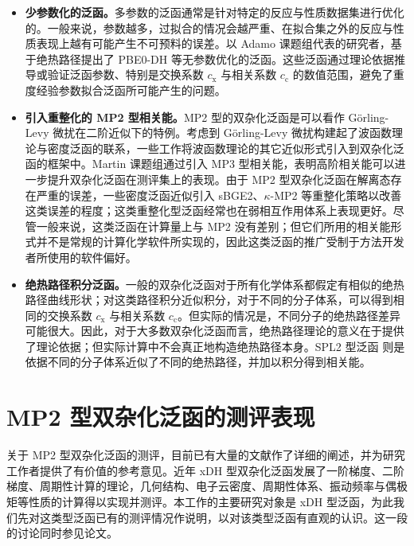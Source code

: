 \begin{itemize}[nosep]
  \item \textbf{少参数化的泛函。}多参数的泛函通常是针对特定的反应与性质数据集进行优化的。一般来说，参数越多，过拟合的情况会越严重、在拟合集之外的反应与性质表现上越有可能产生不可预料的误差\cite{Medvedev-Lyssenko.S.2017}。以 Adamo 课题组代表的研究者，基于绝热路径提出了 PBE0-DH 等无参数优化的泛函\cite{Toulouse-Adamo.JCP.2011}。这些泛函通过理论依据推导或验证泛函参数、特别是交换系数 $c_\mathrm{x}$ 与相关系数 $c_\mathrm{c}$ 的数值范围，避免了重度经验参数拟合泛函所可能产生的问题。
  
  \item \textbf{引入重整化的 MP2 型相关能。}MP2 型的双杂化泛函是可以看作 G\"{o}rling-Levy 微扰在二阶近似下的特例。考虑到 G\"{o}rling-Levy 微扰构建起了波函数理论与密度泛函的联系，一些工作将波函数理论的其它近似形式引入到双杂化泛函的框架中。Martin 课题组通过引入 MP3 型相关能，表明高阶相关能可以进一步提升双杂化泛函在测评集上的表现\cite{Santra-Martin.JPCL.2021}。由于 MP2 型双杂化泛函在解离态存在严重的误差，一些密度泛函\cite{Zhang-Scheffler.PRL.2016, Santra-Martin.JPCL.2022}近似引入 sBGE2\cite{Zhang-Scheffler.NJP.2016}、$\kappa$-MP2\cite{Lee-Head-Gordon.JCTC.2018} 等重整化策略以改善这类误差的程度；这类重整化型泛函经常也在弱相互作用体系上表现更好。尽管一般来说，这类泛函在计算量上与 MP2 没有差别；但它们所用的相关能形式并不是常规的计算化学软件所实现的，因此这类泛函的推广受制于方法开发者所使用的软件偏好。
  
  \item \textbf{绝热路径积分泛函。}一般的双杂化泛函对于所有化学体系都假定有相似的绝热路径曲线形状；对这类路径积分近似积分，对于不同的分子体系，可以得到相同的交换系数 $c_\mathrm{x}$ 与相关系数 $c_\mathrm{c}$。但实际的情况是，不同分子的绝热路径差异可能很大\cite{Teale-Helgaker.JCP.2010}。因此，对于大多数双杂化泛函而言，绝热路径理论的意义在于提供了理论依据；但实际计算中不会真正地构造绝热路径本身。SPL2 型泛函\cite{Seidl-Levy.PRA.1999, Daas-Vuckovic.JPCL.2021, Daas-Vuckovic.arXiv.2023} 则是依据不同的分子体系近似了不同的绝热路径，并加以积分得到相关能。
\end{itemize}

\section{MP2 型双杂化泛函的测评表现}

关于 MP2 型双杂化泛函的测评，目前已有大量的文献作了详细的阐述，并为研究工作者提供了有价值的参考意见。近年 xDH 型双杂化泛函发展了一阶梯度、二阶梯度、周期性计算的理论，几何结构、电子云密度、周期性体系、振动频率与偶极矩等性质的计算得以实现并测评。本工作的主要研究对象是 xDH 型泛函，为此我们先对这类型泛函已有的测评情况作说明，以对该类型泛函有直观的认识。这一段的讨论同时参见论文\cite{Gu.Thesis.2020, Yan.Thesis.2022}。

